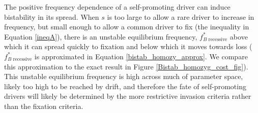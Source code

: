 \documentclass[12pt,letterpaper]{article}
\begin{document}
The positive frequency dependence of a self-promoting driver can
induce bistability in its spread.
When $s$ is too large to allow a rare driver to increase in frequency, but small enough to allow a common driver to fix (the inequality in Equation \ref{ineqA}),
there is  an unstable equilibrium frequency, $f^*_{B\text{ recessive}}$  
	above which it can spread quickly to fixation and below which it moves towards loss 
	($f^*_{B\text{ recessive}}$ is approximated in Equation \ref{bistab_homozy_approx}.  
	We compare this approximation to the exact result in Figure \ref{Bistab_homozyg_cost_fig}).	
This unstable equilibrium frequency is high across much of
	parameter space, likely too high to be reached by drift, 
	and therefore  the fate of self-promoting drivers  will  likely be determined
	by the more restrictive invasion criteria rather than the fixation criteria. 
\end{document}
